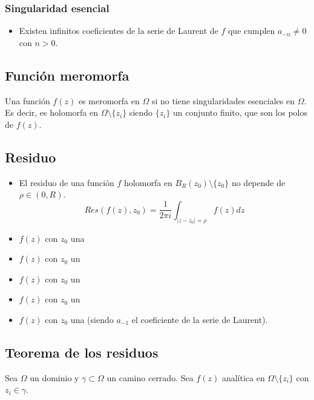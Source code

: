 \documentclass[paper=a4, fontsize=11pt]{scrartcl}
\numberwithin{equation}{section}
\numberwithin{figure}{section}
\numberwithin{table}{section}
\begin{document}
\subsubsection{Singularidad esencial}
\begin{itemize}
\item Existen infinitos coeficientes de la serie de Laurent de $f$ que cumplen $a_{-n}\neq 0$ con $n>0$.
\end{itemize}

\subsection{Función meromorfa}
Una función $f(z)$ es meromorfa en $\Omega$ si no tiene singularidades esenciales en $\Omega$. Es decir, es holomorfa en $\Omega\setminus\{z_i\}$ siendo $\{z_i\}$ un conjunto finito, que son los polos de $f(z)$.

\subsection{Residuo}
\begin{itemize}
\item El residuo de una función $f$ holomorfa en $B_R(z_0)\setminus\{z_0\}$ no depende de $\rho\in(0,R)$.
$$\boxed{Res(f(z), z_0) = \frac{1}{2\pi i}\int_{|z-z_0|=\rho} f(z)dz}$$

\item $f(z)$ con $z_0$ una 
\item $f(z)$ con $z_0$ un 
\item $f(z)$ con $z_0$ un 
\item $f(z)$ con $z_0$ un 
\item $f(z)$ con $z_0$ una  (siendo $a_{-1}$ el coeficiente de la serie de Laurent).
\end{itemize}

\subsection{Teorema de los residuos}
Sea $\Omega$ un dominio y $\gamma\subset\Omega$ un camino cerrado. Sea $f(z)$ analítica en $\Omega\setminus\{z_i\}$ con $z_i\in\gamma$.
\end{document}
